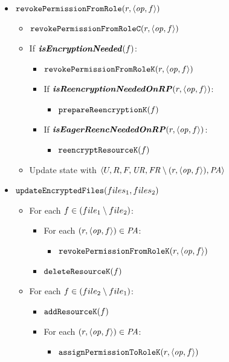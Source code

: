 {\begin{itemize}
        \item \( \mathtt{revokePermissionFromRole}(r, \langle \mathit{op}, f \rangle) \)
        \begin{itemize}
            \item \( \mathtt{revokePermissionFromRole}\mathtt{C}(r, \langle \mathit{op}, f \rangle) \)
            \item If \( \textbf{\textit{isEncryptionNeeded}}(f) \):
            \begin{itemize}
                \item \( \mathtt{revokePermissionFromRole}\mathtt{K}(r, \langle \mathit{op}, f \rangle) \)
                \item If \( \textbf{\textit{isReencryptionNeededOnRP}}(r, \langle \mathit{op}, f \rangle) \):
                \begin{itemize}
                    \item \( \mathtt{prepareReencryption\mathtt{K}}(f) \)
                \end{itemize}
                \item If \( \textbf{\textit{isEagerReencNeededOnRP}}(r, \langle \mathit{op}, f \rangle) \):
                \begin{itemize}
                    \item \( \mathtt{reencryptResource\mathtt{K}}(f) \)
                \end{itemize}
            \end{itemize}
            \item Update state with \( \langle U, \allowbreak R, \allowbreak F, \allowbreak \mathit{UR}, \allowbreak \mathit{FR} \setminus (r, \langle \mathit{op}, \allowbreak f \rangle), \allowbreak \mathit{PA} \rangle \)
        \end{itemize}

        \item \( \mathtt{updateEncryptedFiles}(files_1, files_2) \)
        \begin{itemize}
            \item For each \( f \in (file_1 \setminus file_2) \):
            \begin{itemize}
                \item For each \( (r, \langle \mathit{op}, \allowbreak f \rangle) \in \mathit{PA} \):
                \begin{itemize}
                    \item \( \mathtt{revokePermissionFromRole}\mathtt{K}(r, \langle \mathit{op}, f \rangle) \)
                \end{itemize}
                \item \( \mathtt{deleteResource}\mathtt{K}(f) \)
            \end{itemize}
            \item For each \( f \in (file_2 \setminus file_1) \):
            \begin{itemize}
                \item \( \mathtt{addResource}\mathtt{K}(f) \)
                \item For each \( (r, \langle \mathit{op}, \allowbreak f \rangle) \in \mathit{PA} \):
                \begin{itemize}
                    \item \( \mathtt{assignPermissionToRole}\mathtt{K}(r, \langle \mathit{op}, f \rangle) \)
                \end{itemize}
            \end{itemize}
        \end{itemize}


\end{itemize}}

